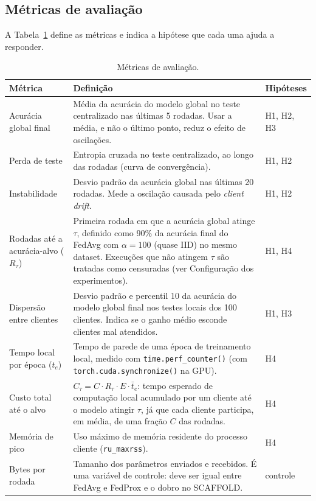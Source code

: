 \subsection{Métricas de avaliação}

A Tabela~\ref{tab:metricas} define as métricas e indica a hipótese que cada uma ajuda a responder.

\begin{table}[t]
    \centering\small
    \caption{Métricas de avaliação.}
    \label{tab:metricas}
    \begin{tabular}{@{}p{3.6cm}p{9.6cm}p{2.2cm}@{}}
        \toprule
        Métrica & Definição & Hipóteses \\
        \midrule
        Acurácia global final & Média da acurácia do modelo global no teste centralizado nas últimas 5 rodadas. Usar a média, e não o último ponto, reduz o efeito de oscilações. & H1, H2, H3 \\
        Perda de teste & Entropia cruzada no teste centralizado, ao longo das rodadas (curva de convergência). & H1, H2 \\
        Instabilidade & Desvio padrão da acurácia global nas últimas 20 rodadas. Mede a oscilação causada pelo \textit{client drift}. & H1, H2 \\
        Rodadas até a acurácia-alvo ($R_\tau$) & Primeira rodada em que a acurácia global atinge $\tau$, definido como 90\% da acurácia final do FedAvg com $\alpha = 100$ (quase IID) no mesmo dataset. Execuções que não atingem $\tau$ são tratadas como censuradas (ver Configuração dos experimentos). & H1, H4 \\
        Dispersão entre clientes & Desvio padrão e percentil 10 da acurácia do modelo global final nos testes locais dos 100 clientes. Indica se o ganho médio esconde clientes mal atendidos. & H1, H3 \\
        Tempo local por época ($t_e$) & Tempo de parede de uma época de treinamento local, medido com \texttt{time.perf\_counter()} (com \texttt{torch.cuda.synchronize()} na GPU). & H4 \\
        Custo total até o alvo & $C_\tau = C \cdot R_\tau \cdot E \cdot \bar{t}_e$: tempo esperado de computação local acumulado por um cliente até o modelo atingir $\tau$, já que cada cliente participa, em média, de uma fração $C$ das rodadas. & H4 \\
        Memória de pico & Uso máximo de memória residente do processo cliente (\texttt{ru\_maxrss}). & H4 \\
        Bytes por rodada & Tamanho dos parâmetros enviados e recebidos. É uma variável de controle: deve ser igual entre FedAvg e FedProx e o dobro no SCAFFOLD. & controle \\
        \bottomrule
    \end{tabular}
\end{table}

